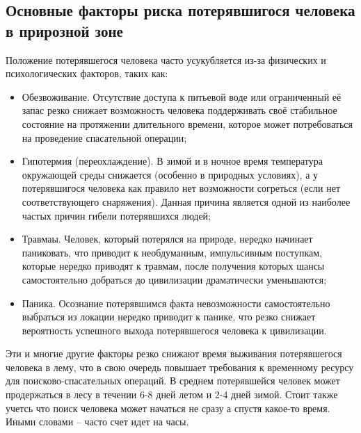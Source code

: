 \subsection{Основные факторы риска потерявшигося человека в прирозной зоне}

Положение потерявшегося человека часто усукубляется из-за физических и психологических факторов, таких как:

\begin{itemize}
    \item Обезвоживание. Отсутствие доступа к питьевой воде или ограниченный её запас резко снижает возможность человека поддерживать своё стабильное состояние на протяжении длительного времени, которое может потребоваться на проведение спасательной операции;
    \item Гипотермия (переохлаждение). В зимой и в ночное время температура окружающей среды снижается (особенно в природных условиях), а у потерявшигося человека как правило нет возможности согреться (если нет соответствующего снаряжения). Данная причина является одной из наиболее частых причин гибели потерявшихся людей;
    \item Травмаы. Человек, который потерялся на природе, нередко начинает паниковать, что приводит к необдуманным, импульсивным поступкам, которые нередко приводят к травмам, после получения которых шансы самостоятельно добраться до цивилизации драматически уменьшаются;
    \item Паника. Осознание потерявшимся факта невозможности самостоятельно выбраться из локации нередко приводит к панике, что резко снижает вероятность успешного выхода потерявшегося человека к цивилизации.
\end{itemize}

Эти и многие другие факторы резко снижают время выживания потерявшегося человека в лему, что в свою очередь повышает требования к временному ресурсу для поисково-спасательных операций. В среднем потерявшейся человек может продержаться в лесу в течении 6-8 дней летом и 2-4 дней зимой. Стоит также учетсь что поиск человека может начаться не сразу а спустя какое-то время. Иными словами -- часто счет идет на часы.
